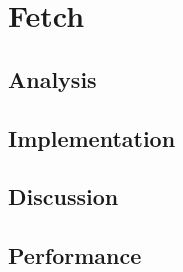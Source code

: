 \section{Fetch}
\subsection{Analysis} %
\subsection{Implementation} %
\subsection{Discussion} %
\subsection{Performance} %
